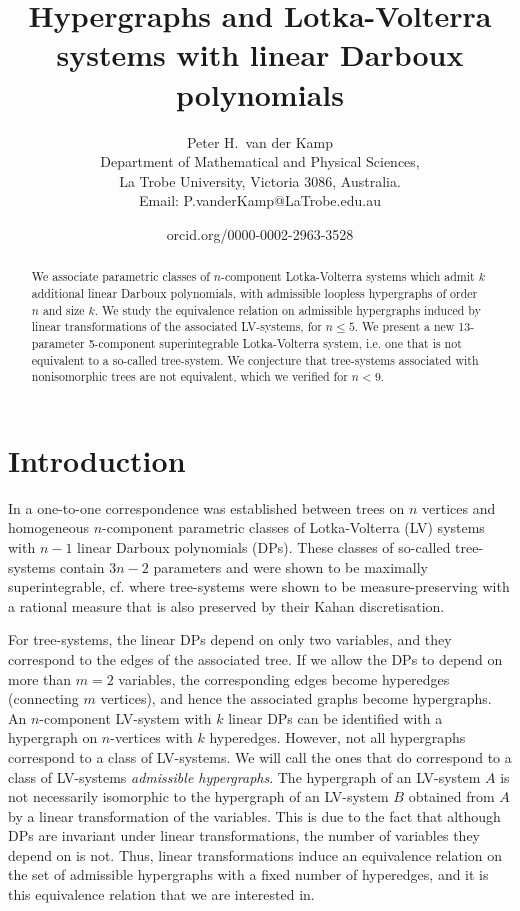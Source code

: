\documentclass{article}
\begin{document}
\title{Hypergraphs and Lotka-Volterra systems with linear Darboux polynomials}
\author{
Peter H.~van der Kamp\\[2mm]
Department of Mathematical and Physical Sciences,\\
La Trobe University, Victoria 3086, Australia.\\
Email: P.vanderKamp@LaTrobe.edu.au\\[7mm]
}

\date{orcid.org/0000-0002-2963-3528}

\maketitle

\begin{abstract}
We associate parametric classes of $n$-component Lotka-Volterra systems which admit $k$ additional linear Darboux polynomials, with admissible loopless hypergraphs of order $n$ and size $k$. We study the equivalence relation on admissible hypergraphs induced by linear transformations of the associated LV-systems, for $n\leq 5$. We present a new 13-parameter 5-component superintegrable Lotka-Volterra system, i.e. one that is not equivalent to a so-called tree-system. We conjecture that tree-systems associated with nonisomorphic trees are not equivalent, which we verified for $n<9$.
\end{abstract}

\section{Introduction}
In \cite{QTMK,trees} a one-to-one correspondence was established between trees on $n$ vertices and homogeneous $n$-component parametric classes of Lotka-Volterra (LV) systems with $n-1$ linear Darboux polynomials (DPs). These classes of so-called tree-systems contain $3n-2$ parameters and were shown to be maximally superintegrable, cf. \cite{KMMQ} where tree-systems were shown to be measure-preserving with a rational measure that is also preserved by their Kahan discretisation.

For tree-systems, the linear DPs  depend on only two variables, and they correspond to the edges of the associated tree. If we allow the DPs to depend on more than $m=2$ variables, the corresponding edges become hyperedges (connecting $m$ vertices), and hence the associated graphs become hypergraphs. An $n$-component LV-system with $k$ linear DPs can be identified with a hypergraph on $n$-vertices with $k$ hyperedges. However, not all hypergraphs correspond to a class of LV-systems. We will call the ones that do correspond to a class of LV-systems {\em admissible hypergraphs}. The hypergraph of an LV-system $A$ is not necessarily isomorphic to the hypergraph of an LV-system $B$ obtained from $A$ by a linear transformation of the variables. This is due to the fact that although DPs are invariant under linear transformations, the number of variables they depend on is not. Thus, linear transformations induce an equivalence relation on the set of admissible hypergraphs with a fixed number of hyperedges, and it is this equivalence relation that we are interested in. 
\end{document}
